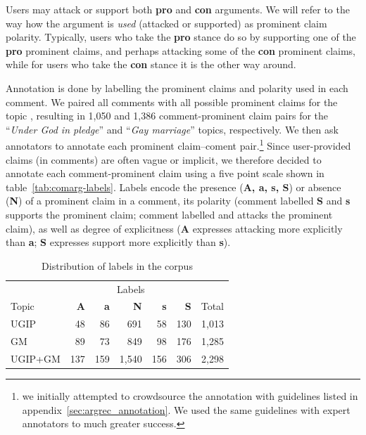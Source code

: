 Users may attack or support both \textbf{pro} and \textbf{con} arguments. 
We will refer to the way how the argument is \textit{used} (attacked or supported)
as prominent claim polarity. 
Typically, users who take the \textbf{pro} stance do so by supporting one of the \textbf{pro}
prominent claims, and perhaps attacking some of the \textbf{con} prominent claims, while
for users who take the \textbf{con} stance it is the other way around. 


Annotation is done by labelling the prominent claims and polarity  
used in each comment. 
We paired all comments with all possible prominent claims for the topic , resulting in
1,050 and 1,386 comment-prominent claim pairs for the ``\emph{Under God
in pledge}'' and ``\emph{Gay marriage}'' topics, respectively. 
We then ask annotators to annotate each prominent claim--coment pair.\footnote{we 
initially attempted to crowdsource the annotation with guidelines listed in 
appendix~\ref{sec:argrec_annotation}. We used the same guidelines with expert annotators
to much greater success.}
Since user-provided claims (in comments) are often vague or implicit, we therefore decided to
annotate each comment-prominent claim using a five point scale shown in 
table~\ref{tab:comarg-labels}. Labels encode the presence (\textbf{A, a, s, S})
or absence (\textbf{N}) of a prominent claim in a comment, its polarity
(comment labelled \textbf{S} and \textbf{s} supports the prominent claim; comment labelled
 and  attacks the prominent claim),
as well as degree of 
explicitness (\textbf{A} expresses attacking more explicitly than \textbf{a};
\textbf{S} expresses support
more explicitly than \textbf{s}). 

\begin{table}
\centering
{\small
\begin{tabular}{lrrrrrr}
\toprule
& \multicolumn{5}{c}{Labels}\\
\cmidrule(lr){2-6}
Topic & \textbf{A} & \textbf{a} & \textbf{N} & \textbf{s} & \textbf{S} & Total \\
\midrule
UGIP         & 48  & 86 & 691 & 58 & 130 & 1,013 \\
GM           & 89 & 73 & 849 & 98 & 176 & 1,285 \\
UGIP+GM      & 137 & 159 &1,540 & 156& 306 & 2,298 \\
\bottomrule
\end{tabular}
}
\caption{Distribution of labels in the \ComArg corpus}
\label{tab:labels}
\end{table}


